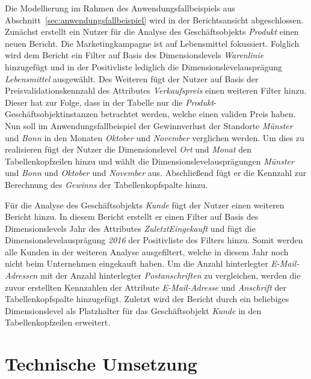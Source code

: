 \documentclass[
  language=german, %
  type=bachelor,%
  ngerman
]{isthesis}
\begin{document}
\begin{content}
  Die Modellierung im Rahmen des Anwendungsfallbeispiels aus
  Abschnitt~\ref{sec:anwendungsfallbeispiel} wird in der Berichtsansicht
  abgeschlossen. Zunächst erstellt ein Nutzer für die Analyse des
  Geschäftsobjekts \textit{Produkt} einen neuen Bericht. Die Marketingkampagne
  ist auf Lebensmittel fokussiert. Folglich wird dem Bericht ein Filter auf
  Basis des Dimensionslevels \textit{Warenlinie} hinzugefügt und in der
  Positivliste lediglich die Dimensionslevelausprägung \textit{Lebensmittel}
  ausgewählt. Des Weiteren fügt der Nutzer auf Basis der
  Preisvalidationskennzahl des Attributes \textit{Verkaufspreis} einen weiteren
  Filter hinzu. Dieser hat zur Folge, dass in der Tabelle nur die
  \textit{Produkt}-Geschäftsobjektinstanzen betrachtet werden, welche einen
  validen Preis haben. Nun soll im Anwendungsfallbeispiel der Gewinnverlust der
  Standorte \textit{Münster} und \textit{Bonn} in den Monaten \textit{Oktober}
  und \textit{November} verglichen werden. Um dies zu realisieren fügt der
  Nutzer die Dimensionslevel \textit{Ort} und \textit{Monat} den
  Tabellenkopfzeilen hinzu und wählt die Dimensionslevelausprägungen
  \textit{Münster} und \textit{Bonn} und \textit{Oktober} und \textit{November}
  aus. Abschließend fügt er die Kennzahl zur Berechnung des \textit{Gewinns}
  der Tabellenkopfspalte hinzu.  

  Für die Analyse des Geschäftsobjekts \textit{Kunde} fügt der Nutzer einen
  weiteren Bericht hinzu. In diesem Bericht erstellt er einen Filter auf Basis
  des Dimensionslevels Jahr des Attributes \textit{ZuletztEingekauft} und fügt
  die Dimensionslevelausprägung \textit{2016} der Positivliste des Filters
  hinzu. Somit werden alle Kunden in der weiteren Analyse ausgefiltert, welche
  in diesem Jahr noch nicht beim Unternehmen eingekauft haben. Um die Anzahl
  hinterlegter \textit{E-Mail-Adressen} mit der Anzahl hinterlegter
  \textit{Postanschriften} zu vergleichen, werden die zuvor erstellten
  Kennzahlen der Attribute \textit{E-Mail-Adresse} und \textit{Anschrift} der
  Tabellenkopfspalte hinzugefügt. Zuletzt wird der Bericht durch ein beliebiges
  Dimensionslevel als Platzhalter für das Geschäftsobjekt \textit{Kunde} in den
  Tabellenkopfzeilen erweitert.


  \section{Technische Umsetzung}


\end{content}
\end{document}
